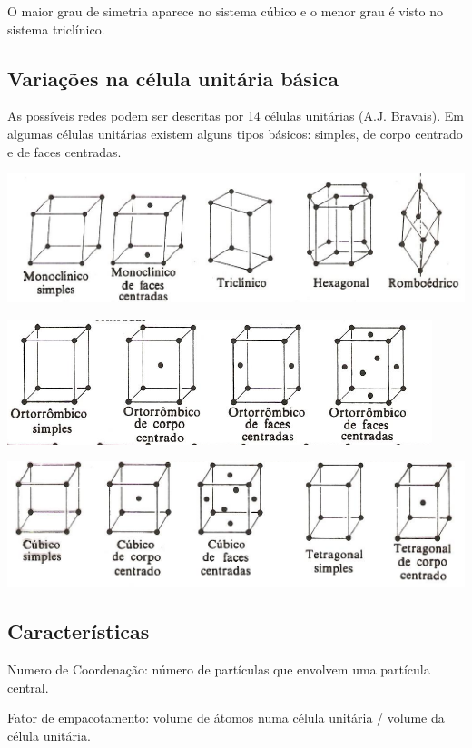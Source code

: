 O maior grau de simetria aparece no sistema cúbico e o menor grau é visto no sistema triclínico.

\subsection*{Variações na célula unitária básica}

As possíveis redes podem ser descritas por 14 células unitárias (A.J. Bravais).
Em algumas células unitárias existem alguns tipos básicos: simples, de corpo centrado e de faces centradas.
 
 \includegraphics[scale=0.4,trim={0 0 0 0}]{figures/var1}
 
 \includegraphics[scale=0.45,trim={0 0 0 0}]{figures/var2}
 
 \includegraphics[scale=0.5,trim={0 0 0 0}]{figures/var3}



\subsection*{Características}

Numero de Coordenação: número de partículas que envolvem uma partícula central.

Fator de empacotamento: volume de átomos numa célula unitária / volume da célula unitária.

